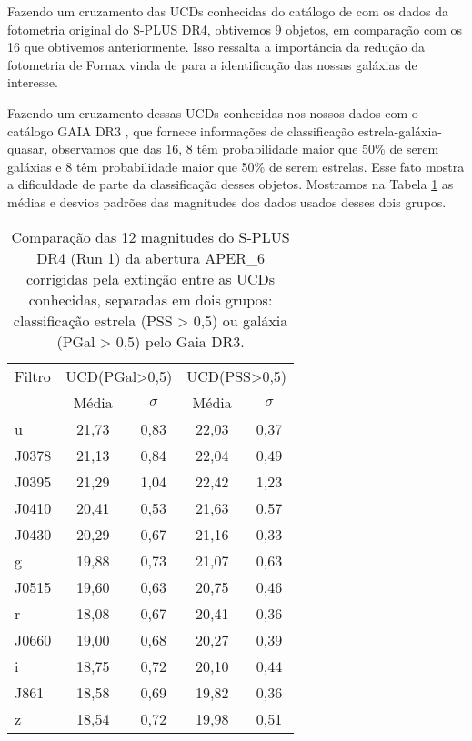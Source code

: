 Fazendo um cruzamento das UCDs conhecidas do catálogo de \cite{catalog_ucds} com os dados da fotometria original do S-PLUS DR4, obtivemos 9 objetos, em comparação com os 16 que obtivemos anteriormente. Isso ressalta a importância da redução da fotometria de Fornax vinda de \cite{haack2024splusfornaxprojectsfp} para a identificação das nossas galáxias de interesse.

Fazendo um cruzamento dessas UCDs conhecidas nos nossos dados com o catálogo GAIA DR3 \citep{GAIA_DR3}, que fornece informações de classificação estrela-galáxia-quasar, observamos que das 16, 8 têm probabilidade maior que 50\% de serem galáxias e 8 têm probabilidade maior que 50\% de serem estrelas. Esse fato mostra a dificuldade de parte da classificação desses objetos. Mostramos na Tabela \ref{tab_ucds_stars_galaxy_like} as médias e desvios padrões das magnitudes dos dados usados desses dois grupos.

\begin{table}[!ht]
    \centering
    \caption{Comparação das 12 magnitudes do S-PLUS DR4 (Run 1) da abertura APER\_6 corrigidas pela extinção entre as UCDs conhecidas, separadas em dois grupos: classificação estrela (PSS > 0,5) ou galáxia (PGal > 0,5) pelo Gaia DR3.}   
    \begin{tabular}{lcccc}
        \toprule
        Filtro & \multicolumn{2}{c}{UCD(PGal>0,5)} & \multicolumn{2}{c}{UCD(PSS>0,5)} \\
        & Média & $\sigma$ & Média & $\sigma$ \\
        \midrule
        u & 21,73 & 0,83 & 22,03 & 0,37 \\
        J0378 & 21,13 & 0,84 & 22,04 & 0,49 \\
        J0395 & 21,29 & 1,04 & 22,42 & 1,23 \\
        J0410 & 20,41 & 0,53 & 21,63 & 0,57 \\
        J0430 & 20,29 & 0,67 & 21,16 & 0,33 \\
        g    & 19,88 & 0,73 & 21,07 & 0,63 \\
        J0515 & 19,60 & 0,63 & 20,75 & 0,46 \\
        r    & 18,08 & 0,67 & 20,41 & 0,36 \\
        J0660 & 19,00 & 0,68 & 20,27 & 0,39 \\
        i    & 18,75 & 0,72 & 20,10 & 0,44 \\
        J861 & 18,58 & 0,69 & 19,82 & 0,36 \\
        z    & 18,54 & 0,72 & 19,98 & 0,51 \\
        \bottomrule
    \end{tabular}
    \label{tab_ucds_stars_galaxy_like}
\end{table}

